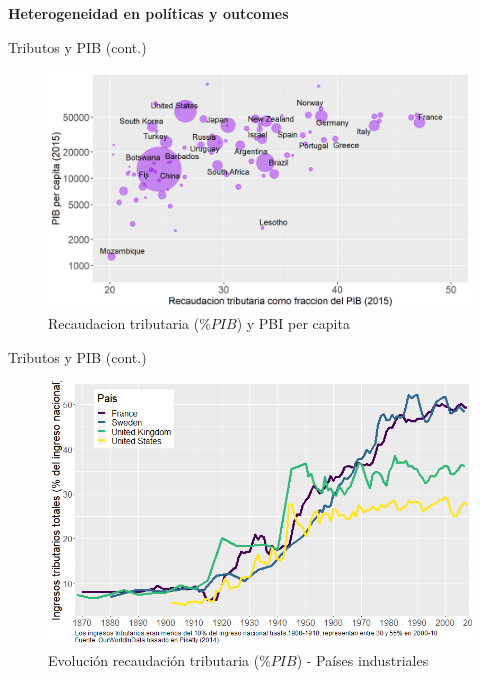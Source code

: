 \documentclass[
  ignorenonframetext,
]{beamer}
\begin{document}
\begin{frame}{\textbf{Heterogeneidad en políticas y outcomes}}
\begin{block}{Tributos y PIB (cont.)}
\begin{figure}
{\centering \includegraphics{../epol/fig/fig-01-004.png}

}

\caption{Recaudacion tributaria (\(\%PIB\)) y PBI per capita}

\end{figure}
\end{block}

\begin{block}{Tributos y PIB (cont.)}
\protect\hypertarget{tributos-y-pib-cont.-1}{}
\begin{figure}

{\centering \includegraphics{../epol/fig/fig-01-005.png}

}

\caption{Evolución recaudación tributaria (\(\%PIB\)) - Países
industriales}

\end{figure}
\end{block}
\end{frame}
\end{document}

